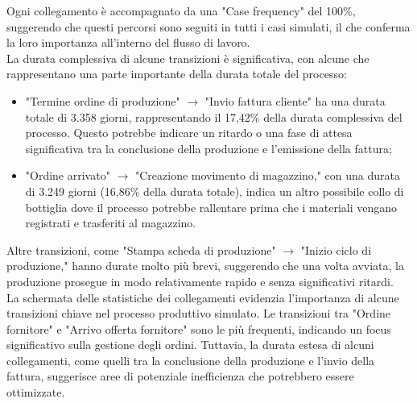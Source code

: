 \documentclass{article}
\begin{document}
Ogni collegamento è accompagnato da una "Case frequency" del 100\%, suggerendo che questi percorsi sono seguiti in tutti i casi simulati, il che conferma la loro importanza all'interno del flusso di lavoro.\\
La durata complessiva di alcune transizioni è significativa, con alcune che rappresentano una parte importante della durata totale del processo:
\begin{itemize}
    \item "Termine ordine di produzione" $\rightarrow$ "Invio fattura cliente" ha una durata totale di 3.358 giorni, rappresentando il 17,42\% della durata complessiva del processo. Questo potrebbe indicare un ritardo o una fase di attesa significativa tra la conclusione della produzione e l'emissione della fattura;
    \item "Ordine arrivato" $\rightarrow$ "Creazione movimento di magazzino," con una durata di 3.249 giorni (16,86\% della durata totale), indica un altro possibile collo di bottiglia dove il processo potrebbe rallentare prima che i materiali vengano registrati e trasferiti al magazzino.
\end{itemize}
Altre transizioni, come "Stampa scheda di produzione" $\rightarrow$ "Inizio ciclo di produzione," hanno durate molto più brevi, suggerendo che una volta avviata, la produzione prosegue in modo relativamente rapido e senza significativi ritardi.\\
La schermata delle statistiche dei collegamenti evidenzia l'importanza di alcune transizioni chiave nel processo produttivo simulato. Le transizioni tra "Ordine fornitore" e "Arrivo offerta fornitore" sono le più frequenti, indicando un focus significativo sulla gestione degli ordini. Tuttavia, la durata estesa di alcuni collegamenti, come quelli tra la conclusione della produzione e l'invio della fattura, suggerisce aree di potenziale inefficienza che potrebbero essere ottimizzate.
\end{document}
